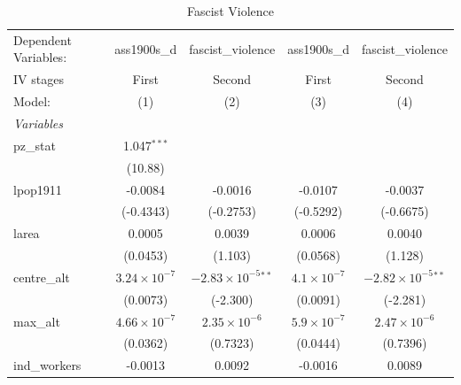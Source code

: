 
\begin{table}[htbp]
   \caption{Fascist Violence}
   \centering
   \begin{tabular}{lcccc}
      \tabularnewline \midrule \midrule
      Dependent Variables:             & ass1900s\_d           & fascist\_violence             & ass1900s\_d          & fascist\_violence\\   
      IV stages                        & First                 & Second                        & First                & Second \\   
      Model:                           & (1)                   & (2)                           & (3)                  & (4)\\  
      \midrule
      \emph{Variables}\\
      pz\_stat                         & 1.047$^{***}$         &                               &                      &   \\   
                                       & (10.88)               &                               &                      &   \\   
      lpop1911                         & -0.0084               & -0.0016                       & -0.0107              & -0.0037\\   
                                       & (-0.4343)             & (-0.2753)                     & (-0.5292)            & (-0.6675)\\   
      larea                            & 0.0005                & 0.0039                        & 0.0006               & 0.0040\\   
                                       & (0.0453)              & (1.103)                       & (0.0568)             & (1.128)\\   
      centre\_alt                      & $3.24\times 10^{-7}$  & $-2.83\times 10^{-5}$$^{**}$  & $4.1\times 10^{-7}$  & $-2.82\times 10^{-5}$$^{**}$\\    
                                       & (0.0073)              & (-2.300)                      & (0.0091)             & (-2.281)\\   
      max\_alt                         & $4.66\times 10^{-7}$  & $2.35\times 10^{-6}$          & $5.9\times 10^{-7}$  & $2.47\times 10^{-6}$\\    
                                       & (0.0362)              & (0.7323)                      & (0.0444)             & (0.7396)\\   
      ind\_workers                     & -0.0013               & 0.0092                        & -0.0016              & 0.0089\\   

\end{tabular}
\end{table}
